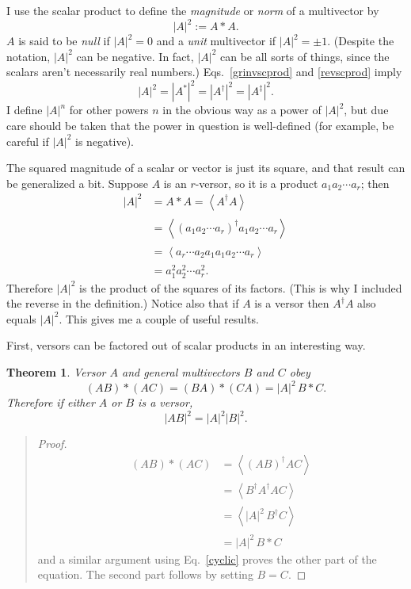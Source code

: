 \documentclass{utarticle}
\newcommand{\grinv}[2][]{\ensuremath{#2^{*#1}}}
\newcommand{\rev}[1]{\ensuremath{#1^\dagger}}
\newcommand{\clifconj}[1]{\ensuremath{#1^\ddagger}}
\newcommand{\scprod}[2]{\ensuremath{#1 * #2}}
\newcommand{\grade}[2][]{\ensuremath{\left\langle #2 \right\rangle_{#1}}}
\newtheorem{thm}{Theorem}
\newcommand{\bp}{\begin{quotation} \begin{proof}}
\newcommand{\ep}{\end{proof} \end{quotation}}
\begin{document}
I use the scalar product to define the \emph{magnitude} or \emph{norm}
of a multivector by
\begin{equation}
|A|^2 := \scprod{A}{A}.
\end{equation}
$A$ is said to be \emph{null} if $|A|^2=0$ and a \emph{unit} multivector if
$|A|^2=\pm1$.  (Despite the notation, $|A|^2$ can be negative.  In fact, $|A|^2$ can be
all sorts of things, since the scalars aren't necessarily real numbers.)  Eqs.~\eqref{grinvscprod} 
and \eqref{revscprod} imply 
\begin{equation} |A|^2 = |\grinv{A}|^2 = |\rev{A}|^2 = |\clifconj{A}|^2.  \end{equation}
I define $|A|^n$ for other powers $n$ in the obvious way as a power of $|A|^2$, but 
due care should be taken that the power in question is well-defined (for example, 
be careful if $|A|^2$ is negative).  

The squared magnitude of a scalar or vector is just its square, and that result 
can be generalized a bit.  Suppose $A$ is an $r$-versor, so it is a product 
$a_1 a_2 \dotsb a_r$; then
\begin{align}
|A|^2 & = \scprod{A}{A} = \grade{\rev{A} A} \nonumber \\
 & = \grade{\rev{(a_1 a_2 \dotsb a_r)} a_1 a_2 \dotsb a_r} \nonumber \\
 & = \grade{a_r \dotsb a_2 a_1 a_1 a_2 \dotsb a_r} \nonumber \\
 & = a_1^2 a_2^2 \dotsb a_r^2.
\label{prodnorm}
\end{align}
Therefore $|A|^2$ is the product of the squares of its factors.  (This is why I
included the reverse in the definition.)  Notice also that if $A$ is a versor then 
$\rev{A} A$ also equals $|A|^2$.  This gives me a couple of useful results.

First, versors can be factored out of scalar products in an interesting way.
\begin{thm}
Versor $A$ and general multivectors $B$ and $C$ obey
\begin{equation}
\scprod{(AB)}{(AC)} = \scprod{(BA)}{(CA)} = |A|^2 \, \scprod{B}{C}.
\end{equation}
Therefore if either $A$ or $B$ is a versor, 
\begin{equation} |AB|^2 = |A|^2 |B|^2. \end{equation}
\label{facversorfromscprod}
\end{thm}
\bp
\begin{align}
\scprod{(AB)}{(AC)} & = \grade{\rev{(AB)} AC} \nonumber \\
                                    & = \grade{\rev{B} \rev{A} AC} \nonumber \\
                                    & = \grade{|A|^2 \, \rev{B} C} \nonumber \\
                                    & = |A|^2 \, \scprod{B}{C}
\end{align}
and a similar argument using Eq.~\eqref{cyclic} proves the other part of the equation.
The second part follows by setting $B=C$.
\ep
\end{document}
